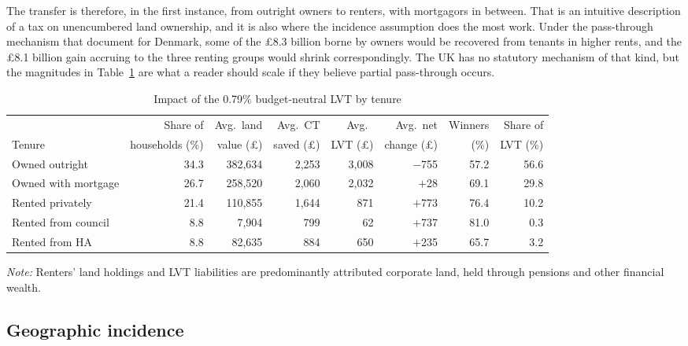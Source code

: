 The transfer is therefore, in the first instance, from outright owners to renters, with mortgagors in between. That is an intuitive description of a tax on unencumbered land ownership, and it is also where the incidence assumption does the most work. Under the pass-through mechanism that \citet{nielsson2024} document for Denmark, some of the \pounds 8.3 billion borne by owners would be recovered from tenants in higher rents, and the \pounds 8.1 billion gain accruing to the three renting groups would shrink correspondingly. The UK has no statutory mechanism of that kind, but the magnitudes in Table~\ref{tab:tenure} are what a reader should scale if they believe partial pass-through occurs.

\begin{table}[htbp]
\centering
\footnotesize
\caption{Impact of the 0.79\% budget-neutral LVT by tenure}
\label{tab:tenure}
\footnotesize
\setlength{\tabcolsep}{4pt}
\begin{tabular}{lrrrrrrr}
\toprule
 & Share of & Avg.\ land & Avg.\ CT & Avg.\ & Avg.\ net & Winners & Share of \\
Tenure & households (\%) & value (\pounds) & saved (\pounds) & LVT (\pounds) & change (\pounds) & (\%) & LVT (\%) \\
\midrule
Owned outright        & 34.3 & 382{,}634 & 2{,}253 & 3{,}008 & $-$755 & 57.2 & 56.6 \\
Owned with mortgage   & 26.7 & 258{,}520 & 2{,}060 & 2{,}032 & $+$28  & 69.1 & 29.8 \\
Rented privately      & 21.4 & 110{,}855 & 1{,}644 & 871     & $+$773 & 76.4 & 10.2 \\
Rented from council   & 8.8  & 7{,}904   & 799     & 62      & $+$737 & 81.0 & 0.3 \\
Rented from HA        & 8.8  & 82{,}635  & 884     & 650     & $+$235 & 65.7 & 3.2 \\
\bottomrule
\end{tabular}

\medskip
{\footnotesize\emph{Note:} Renters' land holdings and LVT liabilities are predominantly attributed corporate land, held through pensions and other financial wealth.}
\end{table}

\subsection{Geographic incidence}
\label{sec:geography}


